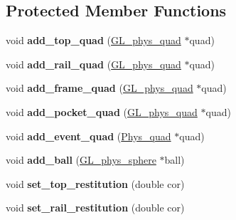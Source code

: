 \subsection*{Protected Member Functions}
\begin{DoxyCompactItemize}
\item 
\hypertarget{class_table_a11c1ed5800952734ec40bfd6c3d09ad9}{
void {\bfseries add\_\-top\_\-quad} (\hyperlink{class_g_l__phys__quad}{GL\_\-phys\_\-quad} $\ast$quad)}
\label{class_table_a11c1ed5800952734ec40bfd6c3d09ad9}

\item 
\hypertarget{class_table_a629ba51d154c0baf6b3d886ac916227d}{
void {\bfseries add\_\-rail\_\-quad} (\hyperlink{class_g_l__phys__quad}{GL\_\-phys\_\-quad} $\ast$quad)}
\label{class_table_a629ba51d154c0baf6b3d886ac916227d}

\item 
\hypertarget{class_table_a83fb8ef7de3700a7371ad3c1acdaa186}{
void {\bfseries add\_\-frame\_\-quad} (\hyperlink{class_g_l__phys__quad}{GL\_\-phys\_\-quad} $\ast$quad)}
\label{class_table_a83fb8ef7de3700a7371ad3c1acdaa186}

\item 
\hypertarget{class_table_aa6445d1852adfbcc305db40a63abf79d}{
void {\bfseries add\_\-pocket\_\-quad} (\hyperlink{class_g_l__phys__quad}{GL\_\-phys\_\-quad} $\ast$quad)}
\label{class_table_aa6445d1852adfbcc305db40a63abf79d}

\item 
\hypertarget{class_table_aba25d684ba11266cb4e2d2e261ad875c}{
void {\bfseries add\_\-event\_\-quad} (\hyperlink{class_phys__quad}{Phys\_\-quad} $\ast$quad)}
\label{class_table_aba25d684ba11266cb4e2d2e261ad875c}

\item 
\hypertarget{class_table_a3c10ffb9c4c9481688f2ecaca5fd7b1f}{
void {\bfseries add\_\-ball} (\hyperlink{class_g_l__phys__sphere}{GL\_\-phys\_\-sphere} $\ast$ball)}
\label{class_table_a3c10ffb9c4c9481688f2ecaca5fd7b1f}

\item 
\hypertarget{class_table_aa3a59706ffeb4df1126f2e8ac2754949}{
void {\bfseries set\_\-top\_\-restitution} (double cor)}
\label{class_table_aa3a59706ffeb4df1126f2e8ac2754949}

\item 
\hypertarget{class_table_a2c0c1a6096c2e48732eb5acd7744a2c0}{
void {\bfseries set\_\-rail\_\-restitution} (double cor)}
\label{class_table_a2c0c1a6096c2e48732eb5acd7744a2c0}


\end{DoxyCompactItemize}
